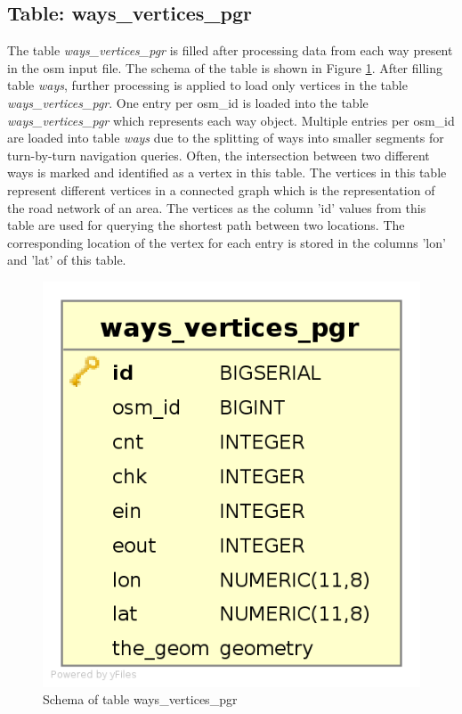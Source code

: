 \subsection{Table: ways{\_}vertices{\_}pgr}
The table \textit{ways{\_}vertices{\_}pgr} is filled after processing data from each way present in the osm input file. The schema of the table is shown in Figure \ref{fg:waysverticespgr}. After filling table \textit{ways}, further processing is applied to load only vertices in the table \textit{ways{\_}vertices{\_}pgr}. One entry per osm{\_}id is loaded into the table \textit{ways{\_}vertices{\_}pgr} which represents each way object. Multiple entries per osm{\_}id are loaded into table \textit{ways} due to the splitting of ways into smaller segments for turn-by-turn navigation queries. Often, the intersection between two different ways is marked and identified as a vertex in this table. The vertices in this table represent different vertices in a connected graph which is the representation of the road network of an area. The vertices as the column 'id' values from this table are used for querying the shortest path between two locations. The corresponding location of the vertex for each entry is stored in the columns 'lon' and 'lat' of this table.
\begin{figure}
\includegraphics[scale=.31]{waysverticespgr.png}
\caption{Schema of table ways{\_}vertices{\_}pgr}
\label{fg:waysverticespgr}
\end{figure}

